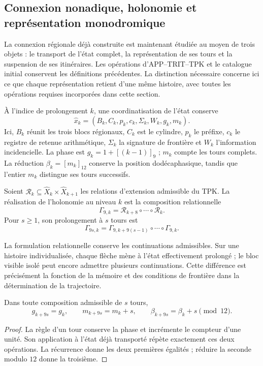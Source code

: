 \subsection{Connexion nonadique, holonomie et représentation monodromique}
\label{mono-ampl:conexion}

La connexion régionale déjà construite est maintenant étudiée au moyen de trois objets :
le transport de l’état complet, la représentation de ses tours et la
suspension de ses itinéraires. Les opérations d’APP--TRIT--TPK et le
catalogue initial conservent les définitions précédentes. La distinction
nécessaire concerne ici ce que chaque représentation retient d’une
même histoire, avec toutes les opérations requises incorporées dans cette
section.

À l'indice de prolongement \(k\), une coordinatisation de l'état conserve
\[
 \widehat x_k=(B_k,C_k,p_k,c_k,\Sigma_k,W_k,g_k,m_k).
\]
Ici, \(B_k\) réunit les trois blocs régionaux, \(C_k\) est le cylindre,
\(p_k\) le préfixe, \(c_k\) le registre de retenue arithmétique, \(\Sigma_k\) la signature
de frontière et \(W_k\) l'information incidencielle. La phase est
\(g_k=1+[(k-1)]_9\) ; \(m_k\) compte les tours complets. La réduction
\(\beta_k=[m_k]_{12}\) conserve la position dodécaphasique, tandis que
l'entier \(m_k\) distingue ses tours successifs.

\begin{definition}
\label{mono-ampl:def-vuelta}
Soient \(\mathcal R_k\subseteq\widehat X_k\times\widehat X_{k+1}\)
les relations d'extension admissible du TPK. La réalisation de
l'holonomie au niveau \(k\) est la composition relationnelle
\[
 \Gamma_{9,k}=\mathcal R_{k+8}\circ\cdots\circ\mathcal R_k.
\]
Pour \(s\geq1\), son prolongement à \(s\) tours est
\[
 \Gamma_{9s,k}=
 \Gamma_{9,k+9(s-1)}\circ\cdots\circ\Gamma_{9,k}.
\]
\end{definition}

La formulation relationnelle conserve les continuations admissibles. Sur
une histoire individualisée, chaque flèche mène à l'état effectivement
prolongé ; le bloc visible isolé peut encore admettre plusieurs
continuations. Cette différence est précisément la fonction de la mémoire et
des conditions de frontière dans la détermination de la trajectoire.

\begin{proposition}
\label{mono-ampl:vueltas}
Dans toute composition admissible de \(s\) tours,
\[
 g_{k+9s}=g_k,\qquad m_{k+9s}=m_k+s,\qquad
 \beta_{k+9s}=\beta_k+s\pmod{12}.
\]
\end{proposition}
\begin{proof}
La règle d'un tour conserve la phase et incrémente le compteur d'une
unité. Son application à l'état déjà transporté répète exactement ces
deux opérations. La récurrence donne les deux premières égalités ; réduire la
seconde modulo \(12\) donne la troisième.
\end{proof}

